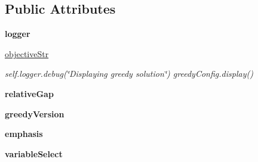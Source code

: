 \subsection*{Public Attributes}
\begin{DoxyCompactItemize}
\item 
\hypertarget{classmapper_1_1src_1_1rmt_1_1orig__rmt__compiler_1_1_rmt_ilp_compiler_a177d1d04e71d2b22a316f682f080b488}{}{\bfseries logger}\label{classmapper_1_1src_1_1rmt_1_1orig__rmt__compiler_1_1_rmt_ilp_compiler_a177d1d04e71d2b22a316f682f080b488}

\item 
\hypertarget{classmapper_1_1src_1_1rmt_1_1orig__rmt__compiler_1_1_rmt_ilp_compiler_a92b457cca9de5d6ee70a60acf73fe596}{}\hyperlink{classmapper_1_1src_1_1rmt_1_1orig__rmt__compiler_1_1_rmt_ilp_compiler_a92b457cca9de5d6ee70a60acf73fe596}{objective\+Str}\label{classmapper_1_1src_1_1rmt_1_1orig__rmt__compiler_1_1_rmt_ilp_compiler_a92b457cca9de5d6ee70a60acf73fe596}

\begin{DoxyCompactList}\small\item\em self.\+logger.\+debug(\char`\"{}\+Displaying greedy solution\char`\"{}) greedy\+Config.\+display() \end{DoxyCompactList}\item 
\hypertarget{classmapper_1_1src_1_1rmt_1_1orig__rmt__compiler_1_1_rmt_ilp_compiler_a9e09aa74a8989e13d48deab6667639b6}{}{\bfseries relative\+Gap}\label{classmapper_1_1src_1_1rmt_1_1orig__rmt__compiler_1_1_rmt_ilp_compiler_a9e09aa74a8989e13d48deab6667639b6}

\item 
\hypertarget{classmapper_1_1src_1_1rmt_1_1orig__rmt__compiler_1_1_rmt_ilp_compiler_ab9be7b0aec4253c282adc4bade1675f8}{}{\bfseries greedy\+Version}\label{classmapper_1_1src_1_1rmt_1_1orig__rmt__compiler_1_1_rmt_ilp_compiler_ab9be7b0aec4253c282adc4bade1675f8}

\item 
\hypertarget{classmapper_1_1src_1_1rmt_1_1orig__rmt__compiler_1_1_rmt_ilp_compiler_ac14c6ee0a270f997fbf2d294d9d1a5b2}{}{\bfseries emphasis}\label{classmapper_1_1src_1_1rmt_1_1orig__rmt__compiler_1_1_rmt_ilp_compiler_ac14c6ee0a270f997fbf2d294d9d1a5b2}

\item 
\hypertarget{classmapper_1_1src_1_1rmt_1_1orig__rmt__compiler_1_1_rmt_ilp_compiler_a58e75eb9ea4c62107506a19c64b34a26}{}{\bfseries variable\+Select}\label{classmapper_1_1src_1_1rmt_1_1orig__rmt__compiler_1_1_rmt_ilp_compiler_a58e75eb9ea4c62107506a19c64b34a26}


\end{DoxyCompactItemize}
